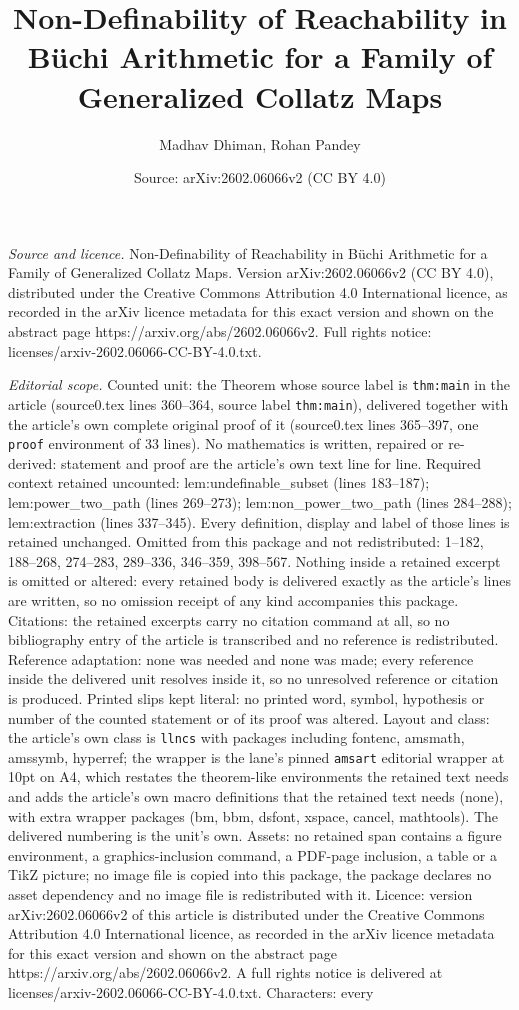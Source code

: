 \documentclass[10pt,a4paper]{amsart}
\title[Non-Definability of Reachability in B\"uchi Arithmetic for a]{Non-Definability of Reachability in B\"uchi Arithmetic for a Family of Generalized Collatz Maps}
\author{Madhav Dhiman, Rohan Pandey}
\date{Source: arXiv:2602.06066v2 (CC BY 4.0)}
\begin{document}
\maketitle

\noindent\emph{Source and licence.} Non-Definability of Reachability in B\"uchi Arithmetic for a Family of Generalized Collatz Maps. Version arXiv:2602.06066v2 (CC BY 4.0), distributed under the Creative Commons Attribution 4.0 International licence, as recorded in the arXiv licence metadata for this exact version and shown on the abstract page https://arxiv.org/abs/2602.06066v2. Full rights notice: licenses/arxiv-2602.06066-CC-BY-4.0.txt.\par\smallskip

\noindent\textit{Editorial scope.} Counted unit: the Theorem whose source label is \texttt{thm:main} in the article (source0.tex lines 360--364, source label \texttt{thm:main}), delivered together with the article's own complete original proof of it (source0.tex lines 365--397, one \texttt{proof} environment of 33 lines). No mathematics is written, repaired or re-derived: statement and proof are the article's own text line for line. Required context retained uncounted: lem:undefinable\_subset (lines 183--187); lem:power\_two\_path (lines 269--273); lem:non\_power\_two\_path (lines 284--288); lem:extraction (lines 337--345). Every definition, display and label of those lines is retained unchanged. Omitted from this package and not redistributed: 1--182, 188--268, 274--283, 289--336, 346--359, 398--567. Nothing inside a retained excerpt is omitted or altered: every retained body is delivered exactly as the article's lines are written, so no omission receipt of any kind accompanies this package. Citations: the retained excerpts carry no citation command at all, so no bibliography entry of the article is transcribed and no reference is redistributed. Reference adaptation: none was needed and none was made; every reference inside the delivered unit resolves inside it, so no unresolved reference or citation is produced. Printed slips kept literal: no printed word, symbol, hypothesis or number of the counted statement or of its proof was altered. Layout and class: the article's own class is \texttt{llncs} with packages including fontenc, amsmath, amssymb, hyperref; the wrapper is the lane's pinned \texttt{amsart} editorial wrapper at 10pt on A4, which restates the theorem-like environments the retained text needs and adds the article's own macro definitions that the retained text needs (none), with extra wrapper packages (bm, bbm, dsfont, xspace, cancel, mathtools). The delivered numbering is the unit's own. Assets: no retained span contains a figure environment, a graphics-inclusion command, a PDF-page inclusion, a table or a TikZ picture; no image file is copied into this package, the package declares no asset dependency and no image file is redistributed with it. Licence: version arXiv:2602.06066v2 of this article is distributed under the Creative Commons Attribution 4.0 International licence, as recorded in the arXiv licence metadata for this exact version and shown on the abstract page https://arxiv.org/abs/2602.06066v2. A full rights notice is delivered at licenses/arxiv-2602.06066-CC-BY-4.0.txt. Characters: every 
\end{document}
